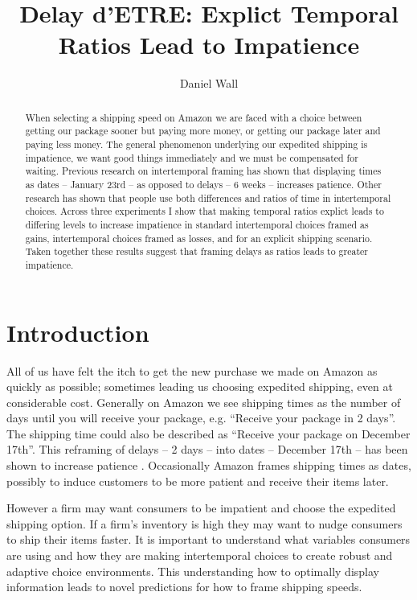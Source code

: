 \documentclass[]{article}
\title{Delay d'ETRE: Explict Temporal Ratios Lead to Impatience}
\author{Daniel Wall}
\begin{document}
\maketitle

\begin{abstract}
	When selecting a shipping speed on Amazon we are faced with a choice between getting our package sooner but paying more money, or getting our package later and paying less money. 
	The general phenomenon underlying our expedited shipping is impatience, we want good things immediately and we must be compensated for waiting. 
	Previous research on intertemporal framing has shown that displaying times as dates -- January 23rd -- as opposed to delays -- 6 weeks -- increases patience. 
	Other research has shown that people use both differences and ratios of time in intertemporal choices. 
	Across three experiments I show that making temporal ratios explict leads to differing levels to increase impatience in standard  intertemporal choices framed as gains, intertemporal choices framed as losses, and for an explicit shipping scenario. 
	Taken together these results suggest that framing delays as ratios leads to greater impatience.

\end{abstract}

\section{Introduction}

All of us have felt the itch to get the new purchase we made on Amazon as quickly as possible; sometimes leading us choosing expedited shipping, even at considerable cost. 
Generally on Amazon we see shipping times as the number of days until you will receive your package, e.g.  ``Receive your package in 2 days''. 
The shipping time could also be described as ``Receive your package on December 17th''. 
This reframing of delays -- 2 days -- into dates -- December 17th -- has been shown to increase patience \cite{Read2005}.
Occasionally Amazon frames shipping times as dates, possibly to induce customers to be more patient and receive their items later. 

However a firm may want consumers to be impatient and choose the expedited shipping option. 
If a firm's inventory is high they may want to nudge consumers to ship their items faster. 
It is important to understand what variables consumers are using and how they are making intertemporal choices to create robust and adaptive choice environments. 
This understanding how to optimally display information leads to novel predictions for how to frame shipping speeds. 
\end{document}
